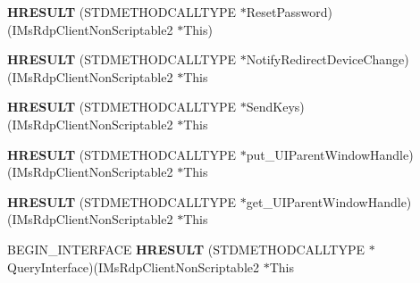 \begin{DoxyCompactItemize}
\item 
\mbox{\label{struct_i_ms_rdp_client_non_scriptable2_vtbl_a65f5417a08207d601c2c899c22b4eddc}} 
{\bfseries H\+R\+E\+S\+U\+LT} (S\+T\+D\+M\+E\+T\+H\+O\+D\+C\+A\+L\+L\+T\+Y\+PE $\ast$Reset\+Password)(I\+Ms\+Rdp\+Client\+Non\+Scriptable2 $\ast$This)
\item 
\mbox{\label{struct_i_ms_rdp_client_non_scriptable2_vtbl_afff02b852de8afd2fc42208edb3ecb57}} 
{\bfseries H\+R\+E\+S\+U\+LT} (S\+T\+D\+M\+E\+T\+H\+O\+D\+C\+A\+L\+L\+T\+Y\+PE $\ast$Notify\+Redirect\+Device\+Change)(I\+Ms\+Rdp\+Client\+Non\+Scriptable2 $\ast$This
\item 
\mbox{\label{struct_i_ms_rdp_client_non_scriptable2_vtbl_a77ef48ae29f5a466c41530c83feb927f}} 
{\bfseries H\+R\+E\+S\+U\+LT} (S\+T\+D\+M\+E\+T\+H\+O\+D\+C\+A\+L\+L\+T\+Y\+PE $\ast$Send\+Keys)(I\+Ms\+Rdp\+Client\+Non\+Scriptable2 $\ast$This
\item 
\mbox{\label{struct_i_ms_rdp_client_non_scriptable2_vtbl_a0bedc3faf8c8b039f8fc56b8c84684eb}} 
{\bfseries H\+R\+E\+S\+U\+LT} (S\+T\+D\+M\+E\+T\+H\+O\+D\+C\+A\+L\+L\+T\+Y\+PE $\ast$put\+\_\+\+U\+I\+Parent\+Window\+Handle)(I\+Ms\+Rdp\+Client\+Non\+Scriptable2 $\ast$This
\item 
\mbox{\label{struct_i_ms_rdp_client_non_scriptable2_vtbl_a8980c995662cffba217b25a7fe6bd908}} 
{\bfseries H\+R\+E\+S\+U\+LT} (S\+T\+D\+M\+E\+T\+H\+O\+D\+C\+A\+L\+L\+T\+Y\+PE $\ast$get\+\_\+\+U\+I\+Parent\+Window\+Handle)(I\+Ms\+Rdp\+Client\+Non\+Scriptable2 $\ast$This
\item 
\mbox{\label{struct_i_ms_rdp_client_non_scriptable2_vtbl_a36e6089272e73d7d3f4ba60a2628cd25}} 
B\+E\+G\+I\+N\+\_\+\+I\+N\+T\+E\+R\+F\+A\+CE {\bfseries H\+R\+E\+S\+U\+LT} (S\+T\+D\+M\+E\+T\+H\+O\+D\+C\+A\+L\+L\+T\+Y\+PE $\ast$Query\+Interface)(I\+Ms\+Rdp\+Client\+Non\+Scriptable2 $\ast$This
\item 
\mbox{\label{struct_i_ms_rdp_client_non_scriptable2_vtbl_a817da8b427e1fd148cf0e0e559675bb8}} 

\end{DoxyCompactItemize}
